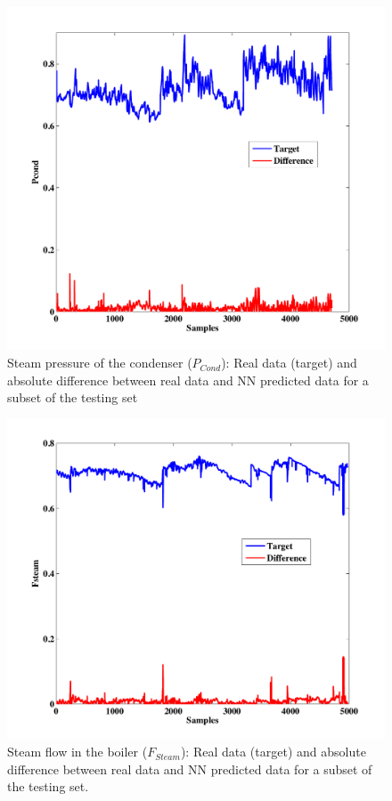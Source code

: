 \begin{figure}
\centering
\includegraphics[width=1\textwidth]{figures/Pcond.pdf}
\caption{Steam pressure of the condenser ($P_{Cond}$): Real data (target) and absolute difference between real data and NN predicted data for a subset of the testing set}
\label{Pcond}
\end{figure}

\begin{figure}
\centering
\includegraphics[width=1\textwidth]{figures/Fsteam.pdf}
\caption{Steam flow in the boiler ($F_{Steam}$): Real data (target) and absolute difference between real data and NN predicted data for a subset of the testing set.}
\label{Fboiler}
\end{figure}

